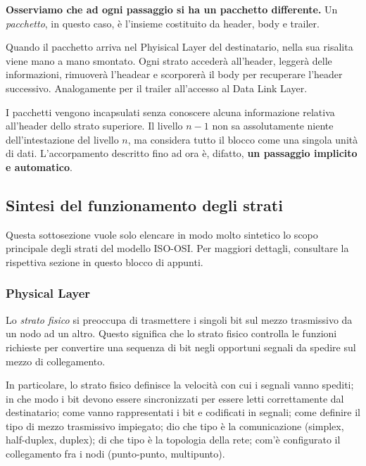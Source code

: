 \vspace{3mm}

\textbf{Osserviamo che ad ogni passaggio si ha un pacchetto differente.} Un \textit{pacchetto}, in questo caso, è l'insieme costituito da header, body e trailer.

\vspace{3mm}

Quando il pacchetto arriva nel Phyisical Layer del destinatario, nella sua risalita viene mano a mano smontato. Ogni strato accederà all'header, leggerà delle informazioni, rimuoverà l'headear e scorporerà il body per recuperare l'header successivo. Analogamente per il trailer all'accesso al Data Link Layer.

\vspace{3mm}

I pacchetti vengono incapsulati senza conoscere alcuna informazione relativa all'header dello strato superiore. Il livello \(n-1\) non sa assolutamente niente dell'intestazione del livello \(n\), ma considera tutto il blocco come una singola unità di dati. L'accorpamento descritto fino ad ora è, difatto, \textbf{un passaggio implicito e automatico}.

\subsection{Sintesi del funzionamento degli strati}

Questa sottosezione vuole solo elencare in modo molto sintetico lo scopo principale degli strati del modello ISO-OSI. Per maggiori dettagli, consultare la rispettiva sezione in questo blocco di appunti.

\subsubsection{Physical Layer}

Lo \textit{strato fisico} si preoccupa di trasmettere i singoli bit sul mezzo trasmissivo da un nodo ad un altro. Questo significa che lo strato fisico controlla le funzioni richieste per convertire una sequenza di bit negli opportuni segnali da spedire sul mezzo di collegamento. 

\vspace{3mm}

In particolare, lo strato fisico definisce la velocità con cui i segnali vanno spediti; in che modo i bit devono essere sincronizzati per essere letti correttamente dal destinatario; come vanno rappresentati i bit e codificati in segnali; come definire il tipo di mezzo trasmissivo impiegato; dio che tipo è la comunicazione (simplex, half-duplex, duplex); di che tipo è la topologia della rete; com'è configurato il collegamento fra i nodi (punto-punto, multipunto).

